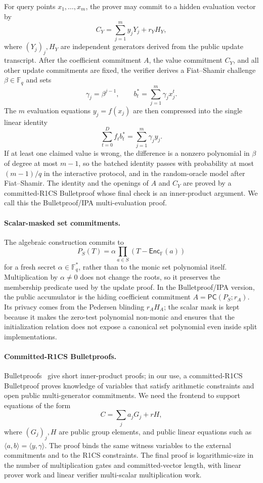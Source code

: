 \documentclass[runningheads]{llncs}
\newcommand{\F}{\mathbb{F}}
\newcommand{\Enc}{\mathsf{Enc}}
\newcommand{\PC}{\mathsf{PC}}
\newcommand{\inner}[2]{\langle #1,#2\rangle}
\begin{document}
For query points \(x_1,\ldots,x_m\), the prover may commit to a hidden evaluation vector by
\[
        C_Y=\sum_{j=1}^m y_jY_j+r_YH_Y,
\]
where \((Y_j)_j,H_Y\) are independent generators derived from the public update transcript.  After the coefficient commitment \(A\), the value commitment \(C_Y\), and all other update commitments are fixed, the verifier derives a Fiat--Shamir challenge \(\beta\in\F_q\) and sets
\[
        \gamma_j=\beta^{j-1},\qquad
        b_t^*=\sum_{j=1}^m\gamma_jx_j^t .
\]
The \(m\) evaluation equations \(y_j=f(x_j)\) are then compressed into the single linear identity
\[
        \sum_{t=0}^D f_tb_t^*=\sum_{j=1}^m\gamma_jy_j .
\]
If at least one claimed value is wrong, the difference is a nonzero polynomial in \(\beta\) of degree at most \(m-1\), so the batched identity passes with probability at most \((m-1)/q\) in the interactive protocol, and in the random-oracle model after Fiat--Shamir.  The identity and the openings of \(A\) and \(C_Y\) are proved by a committed-R1CS Bulletproof whose final check is an inner-product argument.  We call this the Bulletproof/IPA multi-evaluation proof.

\paragraph{Scalar-masked set commitments.}
The algebraic construction commits to
\[
        P_S(T)=\alpha\prod_{a\in S}(T-\Enc_{\F}(a))
\]
for a fresh secret \(\alpha\in\F_q^*\), rather than to the monic set polynomial itself.  Multiplication by \(\alpha\ne0\) does not change the roots, so it preserves the membership predicate used by the update proof.  In the Bulletproof/IPA version, the public accumulator is the hiding coefficient commitment \(A=\PC(P_S;r_A)\).  Its privacy comes from the Pedersen blinding \(r_AH_A\); the scalar mask is kept because it makes the zero-test polynomial non-monic and ensures that the initialization relation does not expose a canonical set polynomial even inside split implementations.


\paragraph{Committed-R1CS Bulletproofs.}
Bulletproofs~\cite{Bulletproofs18} give short inner-product proofs; in our use, a committed-R1CS Bulletproof proves knowledge of variables that satisfy arithmetic constraints and open public multi-generator commitments.  We need the frontend to support equations of the form
\[
        C=\sum_j a_jG_j+rH,
\]
where \((G_j)_j,H\) are public group elements, and public linear equations such as \(\inner{a}{b}=\inner{y}{\gamma}\).  The proof binds the same witness variables to the external commitments and to the R1CS constraints.  The final proof is logarithmic-size in the number of multiplication gates and committed-vector length, with linear prover work and linear verifier multi-scalar multiplication work.
\end{document}
